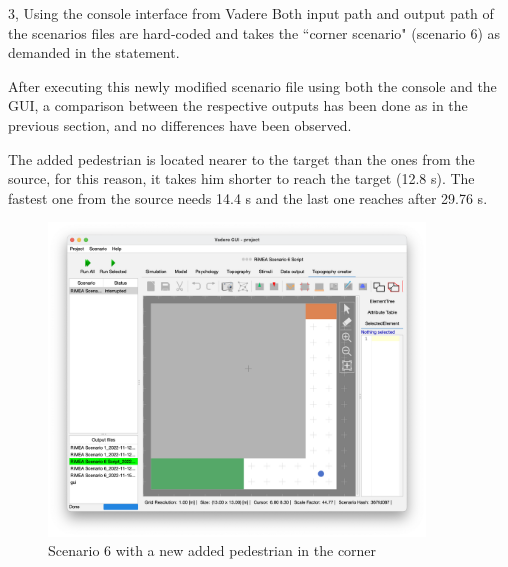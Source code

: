 \documentclass[10pt,a4paper]{article}
\begin{document}
\begin{task}{3, Using the console interface from Vadere}
Both input path and output path of the scenarios files are hard-coded and takes the ``corner scenario" (scenario 6) as demanded in the statement.

After executing this newly modified scenario file using both the console and the GUI, a comparison between the respective outputs has been done as in the previous section, and no differences have been observed. 

The added pedestrian is located nearer to the target than the ones from the source, for this reason, it takes him shorter to reach the target (12.8 s). The fastest one from the source needs 14.4 s and the last one reaches after 29.76 s. 


  \begin{figure} [H]
    \includegraphics[width=10cm]{images/scenario6_task3.png}
    \centering
    \caption{Scenario 6 with a new added pedestrian in the corner}
    \label{sc_6_task_3}
  \end{figure}



\end{task}

\newpage
\end{document}
